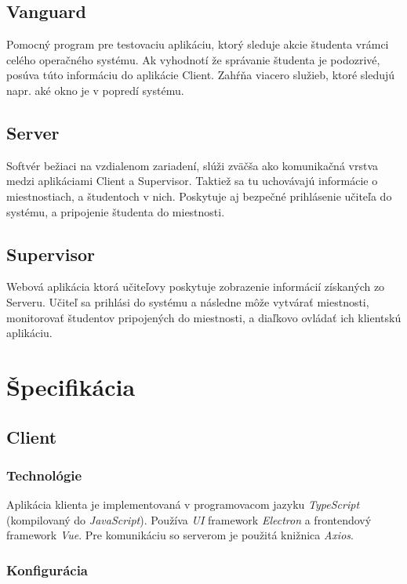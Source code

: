 \documentclass{article}
\begin{document}
\subsection{Vanguard}

Pomocný program pre testovaciu aplikáciu, ktorý sleduje akcie študenta vrámci celého operačného systému. Ak vyhodnotí že správanie študenta je podozrivé, posúva túto informáciu do aplikácie Client. Zahŕňa viacero služieb, ktoré sledujú napr. aké okno je v popredí systému.

\subsection{Server}

Softvér bežiaci na vzdialenom zariadení, slúži zväčša ako komunikačná vrstva medzi aplikáciami Client a Supervisor. Taktiež sa tu uchovávajú informácie o miestnostiach, a študentoch v nich. Poskytuje aj bezpečné prihlásenie učiteľa do systému, a pripojenie študenta do miestnosti.

\subsection{Supervisor}

Webová aplikácia ktorá učiteľovy poskytuje zobrazenie informácií získaných zo Serveru. Učiteľ sa prihlási do systému a následne môže vytvárať miestnosti, monitorovať študentov pripojených do miestnosti, a diaľkovo ovládať ich klientskú aplikáciu.

\section{Špecifikácia}

\subsection{Client}

\subsubsection{Technológie}

Aplikácia klienta je implementovaná v programovacom jazyku \emph{TypeScript} (kompilovaný do \emph{JavaScript}). Používa \emph{UI} framework \emph{Electron} a frontendový framework \emph{Vue}. Pre komunikáciu so serverom je použitá knižnica \emph{Axios}.

\subsubsection{Konfigurácia}
\end{document}
